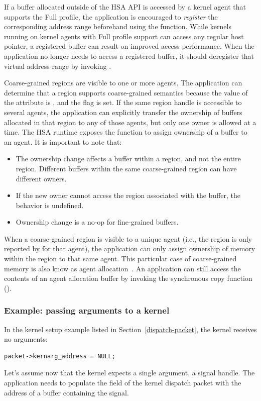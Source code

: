 \documentclass[oneside]{book}
\begin{document}
If a buffer allocated outside of the HSA API is accessed by a kernel agent
that supports the Full profile, the application is encouraged to \emph{register}
the corresponding address range beforehand using the
 function. While kernels running on kernel agents
with Full profile support can access any regular host pointer, a registered
buffer can result on improved access performance.  When the application no
longer needs to access a registered buffer, it should deregister that virtual
address range by invoking .

Coarse-grained regions are visible to one or more agents. The application can
determine that a region supports coarse-grained semantics because the value of
the attribute  is
, and the
 flag is set. If the same region
handle is accessible to several agents, the application can explicitly transfer
the ownership of buffers allocated in that region to any of those agents, but
only one owner is allowed at a time. The HSA runtime exposes the function
 to assign ownership of a buffer to an agent. It
is important to note that:
\begin{itemize}[itemsep=1pt,topsep=3pt,partopsep=0pt]
\item The ownership change affects a buffer within a region, and not the entire
  region. Different buffers within the same coarse-grained region can have
  different owners.
\item If the new owner cannot access the region associated with the buffer, the
  behavior is undefined.
\item Ownership change is a no-op for fine-grained buffers.
\end{itemize}

When a coarse-grained region is visible to a unique agent (i.e., the region
is only reported by  for that agent), the
application can only assign ownership of memory within the region to that same
agent. This particular case of coarse-grained memory is also know as agent
allocation~\cite{prm}. An application can still access the contents of an agent
allocation buffer by invoking the synchronous copy function
().

\subsubsection{Example: passing arguments to a kernel}\label{ex:kernarg_dispatch}
In the kernel setup example listed in Section~\ref{dispatch-packet}, the kernel
receives no arguments:
\begin{lstlisting}
packet->kernarg_address = NULL;
\end{lstlisting}
Let's assume now that the kernel expects a single argument, a signal handle. The
application needs to populate the
 field of the kernel
dispatch packet with the address of a buffer containing the signal.
\end{document}
